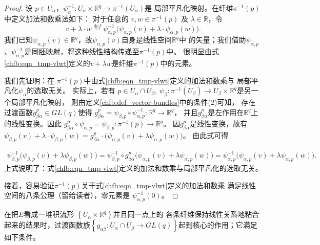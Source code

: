 \begin{proof}
设 $p \in U_\alpha$，$\psi_\alpha^{-1}: U_\alpha \times \mathbb{R}^q \rightarrow \pi^{-1} (U_\alpha)$是
局部平凡化映射。在纤维$\pi^{-1}(p)$中定义加法和数乘法如下：
对于任意的 $v, w \in \pi^{-1}(p)$ 及 $\lambda \in \mathbb{R}$，令
\begin{equation}\label{chfb:eqn_tmp-vlwt}
    v+\lambda \cdot w \overset{def}{=} \psi_{\alpha, p}^{-1} \bigl(\psi_{\alpha, p} (v)
    +\lambda \cdot \psi_{\alpha, p} (w)\bigr) .
\end{equation}
我们已知$\psi_{\alpha, p} (v)\in \mathbb{R}^q$，故$\psi_{\alpha, p} (v)$自身是线性空间$\mathbb{R}^q$中
的矢量；我们借助$\psi_{\alpha, p}$、$\psi_{\alpha, p}^{-1}$是同胚映射，将这种线性结构传递至$\pi^{-1}(p)$中。
很明显由式\eqref{chfb:eqn_tmp-vlwt}定义的$v+ \lambda w $是纤维$ \pi^{-1}(p)$中的元素。

我们先证明：在 $\pi^{-1}(p)$中由式\eqref{chfb:eqn_tmp-vlwt}定义的加法和数乘与
局部平凡化$\psi_\alpha$的选取无关。
实际上，若有 $p \in U_\alpha \cap U_\beta,\ \psi_\beta: \pi^{-1} (U_\beta )
 \rightarrow U_\beta \times \mathbb{R}^q $是另一个局部平凡化映射，
则由定义\ref{chfb:def_vector-bundles}中的条件(2)可知，
存在过渡函数$g_{\beta \alpha}^p \in GL(q)$使得
$g_{\beta \alpha}^p =\psi_{\beta, p} \circ \psi_{\alpha, p}^{-1}: \mathbb{R}^q \rightarrow \mathbb{R}^q $，
并且$g_{\beta \alpha}^p$是左作用在$\mathbb{R}^q$上的线性变换。因此
$g_{\beta \alpha}^p \circ \psi_{\alpha, p}=\psi_{\beta, p}: \pi^{-1}(p) \rightarrow \mathbb{R}^q $。
因$g_{\beta \alpha}^p$是线性变换，故有
$    \psi_{\beta, p}(v )+\lambda \cdot \psi_{\beta, p} (w)=
    g_{\beta \alpha}^p \cdot \bigl(\psi_{\alpha, p}(v)+ \lambda \psi_{\alpha, p} (w)\bigr) $。
由此式可得

\begin{align*}
    \psi_{\beta, p}^{-1} \bigl(\psi_{\beta, p} (v)+\lambda \psi_{\beta, p} (w)\bigr) 
    = \psi_{\beta, p}^{-1} \circ g_{\beta \alpha}^p \bigl(\psi_{\alpha, p}(v)+\lambda \psi_{\alpha, p}(w)\bigr)
    = \psi_{\alpha, p}^{-1} \bigl(\psi_{\alpha, p} (v)+\lambda \psi_{\alpha, p} (w)\bigr) .
\end{align*}
上式说明了：式\eqref{chfb:eqn_tmp-vlwt}定义的加法和数乘与局部平凡化的选取无关。

接着，容易验证$\pi^{-1}(p)$关于式\eqref{chfb:eqn_tmp-vlwt}定义的加法和数乘
满足线性空间的八条公理（留给读者），零元素是 $\psi_{\alpha, p}^{-1}(0)$。
\end{proof}

在把$E$看成一堆积流形 $\left\{U_\alpha \times \mathbb{R}^q\right\}$并且同一点上的
各条纤维保持线性关系地粘合起来的结果时，过渡函数族$\left\{g_{\alpha \beta}: U_\alpha \cap U_\beta 
\rightarrow GL(q)\right\}$起到核心的作用；它满足如下条件。



